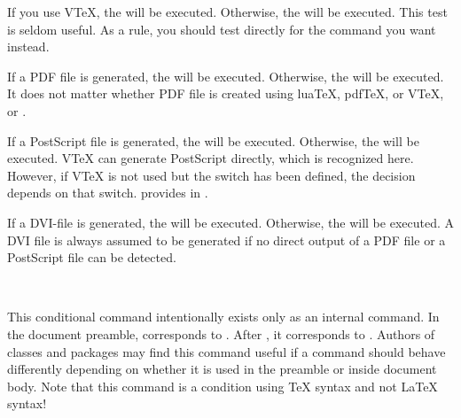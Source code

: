 \begin{Declaration}
\end{Declaration}
If you use V\TeX{}, the  will be executed. Otherwise, the
 will be executed. This test is seldom useful. As a rule,
you should test directly for the command you want instead.%
%
\EndIndexGroup


\begin{Declaration}
\end{Declaration}
If a PDF file is generated, the  will be executed. Otherwise,
the  will be executed. It does not matter whether PDF file is
created using lua\TeX{}, pdf\TeX{}, or V\TeX{}, or \XeTeX{}.%
\EndIndexGroup


\begin{Declaration}
\end{Declaration}
If a PostScript file is generated, the  will be executed.
Otherwise, the  will be executed. V\TeX{} can generate
PostScript directly, which is recognized here. However, if V\TeX{} is not used
but the switch  has been defined, the decision depends on that
switch. \KOMAScript{} provides  in
\hyperref[cha:typearea]{}%
.
%
\EndIndexGroup


\begin{Declaration}
\end{Declaration}
If a DVI-file is generated, the  will be executed. Otherwise,
the  will be executed. A DVI file is always assumed to be
generated if no direct output of a PDF file or a PostScript file can be
detected.%
\EndIndexGroup


\begin{Declaration}
  \ \ %
  \ \ 
\end{Declaration}
This conditional command intentionally exists only as an internal command. In
the document preamble,  corresponds to .
After , it corresponds to .
Authors of classes and packages may find this command useful if a command
should behave differently depending on whether it is used in the preamble or
inside document body. Note that this command is a
condition using \TeX{} syntax and not \LaTeX{} syntax!
%
\EndIndexGroup



